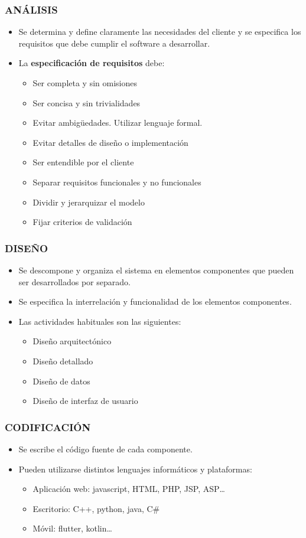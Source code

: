 \documentclass[a4paper]{article}
\begin{document}
\subsubsection{ANÁLISIS}
\label{análisis}
\begin{itemize}
\item Se determina y define claramente las necesidades del cliente y se
especifica los requisitos que debe cumplir el software a desarrollar.
\item La \textbf{especificación de requisitos} debe:
\begin{itemize}
\item Ser completa y sin omisiones
\item Ser concisa y sin trivialidades
\item Evitar ambigüedades. Utilizar lenguaje formal.
\item Evitar detalles de diseño o implementación
\item Ser entendible por el cliente
\item Separar requisitos funcionales y no funcionales
\item Dividir y jerarquizar el modelo
\item Fijar criterios de validación
\end{itemize}
\end{itemize}
\subsubsection{DISEÑO}
\label{diseño}
\begin{itemize}
\item Se descompone y organiza el sistema en elementos componentes que
pueden ser desarrollados por separado.
\item Se especifica la interrelación y funcionalidad de los elementos
componentes.
\item Las actividades habituales son las siguientes:
\begin{itemize}
\item Diseño arquitectónico
\item Diseño detallado
\item Diseño de datos
\item Diseño de interfaz de usuario
\end{itemize}
\end{itemize}
\subsubsection{CODIFICACIÓN}
\label{codificación}
\begin{itemize}
\item Se escribe el código fuente de cada componente.
\item Pueden utilizarse distintos lenguajes informáticos y plataformas:
\begin{itemize}
\item Aplicación web: javascript, HTML, PHP, JSP, ASP\ldots{}
\item Escritorio: C++, python, java, C\#
\item Móvil: flutter, kotlin\ldots{}
\end{itemize}
\end{itemize}
\end{document}
